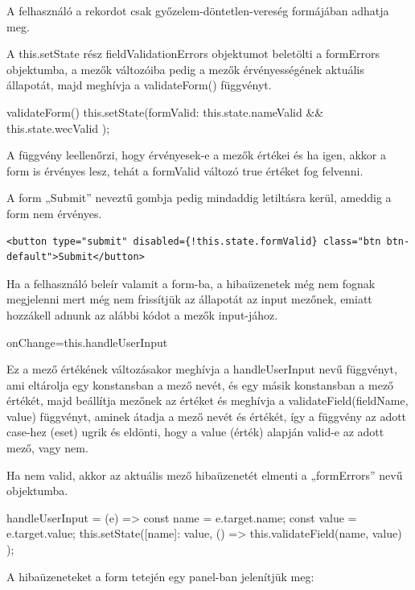A felhasználó a rekordot csak győzelem-döntetlen-vereség formájában adhatja meg.

A this.setState rész fieldValidationErrors objektumot beletölti a formErrors objektumba, a mezők változóiba pedig a mezők érvényességének aktuális állapotát, majd meghívja a validateForm() függvényt.

\begin{cpp}
validateForm() {
    this.setState({formValid: this.state.nameValid && this.state.wecValid });
}
\end{cpp}

A függvény leellenőrzi, hogy érvényesek-e a mezők értékei és ha igen, akkor a form is érvényes lesz, tehát a formValid változó true értéket fog felvenni.

A form „Submit” neveztű gombja pedig mindaddig letiltásra kerül, ameddig a form nem érvényes.

\begin{verbatim}
<button type="submit" disabled={!this.state.formValid} class="btn btn-default">Submit</button>
\end{verbatim}

Ha a felhasználó beleír valamit a form-ba, a hibaüzenetek még nem fognak megjelenni mert még nem frissítjük az állapotát az input mezőnek, emiatt hozzákell adnunk az alábbi kódot a mezők input-jához.

\begin{cpp}
onChange={this.handleUserInput}
\end{cpp}

Ez a mező értékének változásakor meghívja a handleUserInput nevű függvényt, ami eltárolja egy konstansban a mező nevét, és egy másik konstansban a mező értékét, majd beállítja mezőnek az értéket és meghívja a validateField(fieldName, value) függvényt, aminek átadja a mező nevét és értékét, így a függvény az adott case-hez (eset) ugrik és eldönti, hogy a value (érték) alapján valid-e az adott mező, vagy nem.

Ha nem valid, akkor az aktuális mező hibaüzenetét elmenti a „formErrors” nevű objektumba.

\begin{cpp}
handleUserInput = (e) => {
    const name = e.target.name;
    const value = e.target.value;
    this.setState({[name]: value},
                  () => { this.validateField(name, value) }); }
\end{cpp}

A hibaüzeneteket a form tetején egy panel-ban jelenítjük meg:

